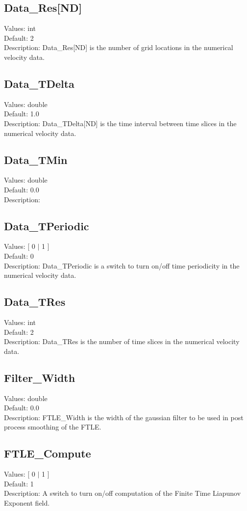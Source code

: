 \documentclass[11pt]{article}
\begin{document}
\subsection{Data\_Res[ND]}
Values:   int \\
Default:  2\\
Description: Data\_Res[ND] is the number of grid locations in the numerical velocity data. 

\subsection{Data\_TDelta}
Values:   double \\
Default:  1.0\\
Description: Data\_TDelta[ND] is the time interval between time slices in the numerical velocity data. 

\subsection{Data\_TMin}
Values:   double \\
Default:  0.0\\
Description: 

\subsection{Data\_TPeriodic}
Values:   [ 0 $|$ 1 ]  \\
Default:  0\\
Description:  Data\_TPeriodic is a switch to turn on/off time periodicity in the numerical velocity data.

\subsection{Data\_TRes}
Values:   int \\
Default:  2\\
Description: Data\_TRes is the number of time slices in the numerical velocity data. 

\subsection{Filter\_Width}
Values:   double \\
Default:  0.0\\
Description:   FTLE\_Width is the width of the gaussian filter to be used in post process smoothing of the FTLE.

\subsection{FTLE\_Compute}
Values: [ 0 $|$ 1 ]\\
Default:  1\\
Description:   A switch to turn on/off computation of the Finite Time Liapunov Exponent field.
\end{document}
